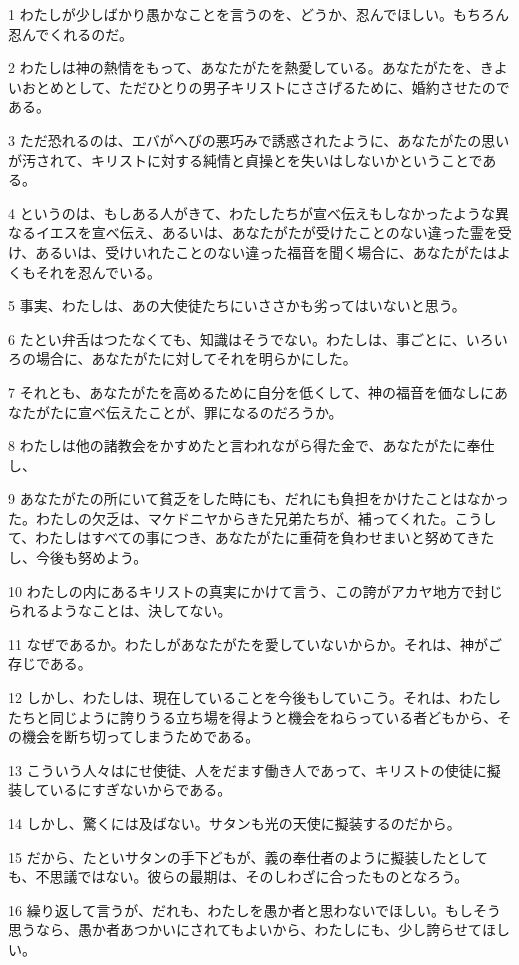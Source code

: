 \par 1 わたしが少しばかり愚かなことを言うのを、どうか、忍んでほしい。もちろん忍んでくれるのだ。
\par 2 わたしは神の熱情をもって、あなたがたを熱愛している。あなたがたを、きよいおとめとして、ただひとりの男子キリストにささげるために、婚約させたのである。
\par 3 ただ恐れるのは、エバがへびの悪巧みで誘惑されたように、あなたがたの思いが汚されて、キリストに対する純情と貞操とを失いはしないかということである。
\par 4 というのは、もしある人がきて、わたしたちが宣べ伝えもしなかったような異なるイエスを宣べ伝え、あるいは、あなたがたが受けたことのない違った霊を受け、あるいは、受けいれたことのない違った福音を聞く場合に、あなたがたはよくもそれを忍んでいる。
\par 5 事実、わたしは、あの大使徒たちにいささかも劣ってはいないと思う。
\par 6 たとい弁舌はつたなくても、知識はそうでない。わたしは、事ごとに、いろいろの場合に、あなたがたに対してそれを明らかにした。
\par 7 それとも、あなたがたを高めるために自分を低くして、神の福音を価なしにあなたがたに宣べ伝えたことが、罪になるのだろうか。
\par 8 わたしは他の諸教会をかすめたと言われながら得た金で、あなたがたに奉仕し、
\par 9 あなたがたの所にいて貧乏をした時にも、だれにも負担をかけたことはなかった。わたしの欠乏は、マケドニヤからきた兄弟たちが、補ってくれた。こうして、わたしはすべての事につき、あなたがたに重荷を負わせまいと努めてきたし、今後も努めよう。
\par 10 わたしの内にあるキリストの真実にかけて言う、この誇がアカヤ地方で封じられるようなことは、決してない。
\par 11 なぜであるか。わたしがあなたがたを愛していないからか。それは、神がご存じである。
\par 12 しかし、わたしは、現在していることを今後もしていこう。それは、わたしたちと同じように誇りうる立ち場を得ようと機会をねらっている者どもから、その機会を断ち切ってしまうためである。
\par 13 こういう人々はにせ使徒、人をだます働き人であって、キリストの使徒に擬装しているにすぎないからである。
\par 14 しかし、驚くには及ばない。サタンも光の天使に擬装するのだから。
\par 15 だから、たといサタンの手下どもが、義の奉仕者のように擬装したとしても、不思議ではない。彼らの最期は、そのしわざに合ったものとなろう。
\par 16 繰り返して言うが、だれも、わたしを愚か者と思わないでほしい。もしそう思うなら、愚か者あつかいにされてもよいから、わたしにも、少し誇らせてほしい。
